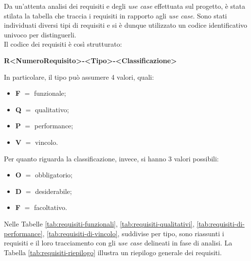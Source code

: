 \noindent Da un'attenta analisi dei requisiti e degli \textit{use case} effettuata sul progetto, è stata stilata la tabella che traccia i requisiti in rapporto agli \textit{use case}.
Sono stati individuati diversi tipi di requisiti e si è dunque utilizzato un codice identificativo univoco per distinguerli.\\
Il codice dei requisiti è così strutturato:
\begin{center}
    \textbf{R<NumeroRequisito>-<Tipo>-<Classificazione>}
\end{center}
In particolare, il tipo può assumere 4 valori, quali:
\begin{itemize}
    \item \textbf{F} $=$ funzionale;
    \item \textbf{Q} $=$ qualitativo;
    \item \textbf{P} $=$ performance;
    \item \textbf{V} $=$ vincolo.
\end{itemize}
Per quanto riguarda la classificazione, invece, si hanno 3 valori possibili:
\begin{itemize}
    \item \textbf{O} $=$ obbligatorio;
    \item \textbf{D} $=$ desiderabile;
    \item \textbf{F} $=$ facoltativo.
\end{itemize}
Nelle Tabelle \ref{tab:requisiti-funzionali}, \ref{tab:requisiti-qualitativi}, \ref{tab:requisiti-di-performance}, \ref{tab:requisiti-di-vincolo}, suddivise per tipo, sono riassunti i requisiti e il loro tracciamento con gli \textit{use case} delineati in fase di analisi.
La Tabella \ref{tab:requisiti-riepilogo} illustra un riepilogo generale dei requisiti.
\renewcommand{\arraystretch}{1.6}


